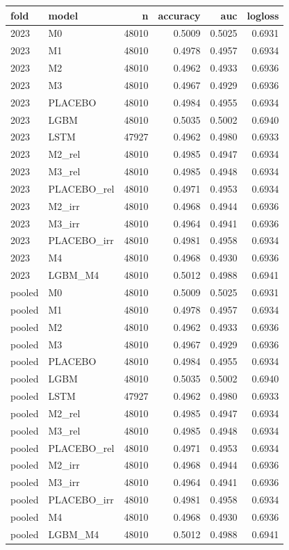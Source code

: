 \begin{tabular}{llrrrr}
\toprule
fold & model & n & accuracy & auc & logloss \\
\midrule
2023 & M0 & 48010 & 0.5009 & 0.5025 & 0.6931 \\
2023 & M1 & 48010 & 0.4978 & 0.4957 & 0.6934 \\
2023 & M2 & 48010 & 0.4962 & 0.4933 & 0.6936 \\
2023 & M3 & 48010 & 0.4967 & 0.4929 & 0.6936 \\
2023 & PLACEBO & 48010 & 0.4984 & 0.4955 & 0.6934 \\
2023 & LGBM & 48010 & 0.5035 & 0.5002 & 0.6940 \\
2023 & LSTM & 47927 & 0.4962 & 0.4980 & 0.6933 \\
2023 & M2\_rel & 48010 & 0.4985 & 0.4947 & 0.6934 \\
2023 & M3\_rel & 48010 & 0.4985 & 0.4948 & 0.6934 \\
2023 & PLACEBO\_rel & 48010 & 0.4971 & 0.4953 & 0.6934 \\
2023 & M2\_irr & 48010 & 0.4968 & 0.4944 & 0.6936 \\
2023 & M3\_irr & 48010 & 0.4964 & 0.4941 & 0.6936 \\
2023 & PLACEBO\_irr & 48010 & 0.4981 & 0.4958 & 0.6934 \\
2023 & M4 & 48010 & 0.4968 & 0.4930 & 0.6936 \\
2023 & LGBM\_M4 & 48010 & 0.5012 & 0.4988 & 0.6941 \\
pooled & M0 & 48010 & 0.5009 & 0.5025 & 0.6931 \\
pooled & M1 & 48010 & 0.4978 & 0.4957 & 0.6934 \\
pooled & M2 & 48010 & 0.4962 & 0.4933 & 0.6936 \\
pooled & M3 & 48010 & 0.4967 & 0.4929 & 0.6936 \\
pooled & PLACEBO & 48010 & 0.4984 & 0.4955 & 0.6934 \\
pooled & LGBM & 48010 & 0.5035 & 0.5002 & 0.6940 \\
pooled & LSTM & 47927 & 0.4962 & 0.4980 & 0.6933 \\
pooled & M2\_rel & 48010 & 0.4985 & 0.4947 & 0.6934 \\
pooled & M3\_rel & 48010 & 0.4985 & 0.4948 & 0.6934 \\
pooled & PLACEBO\_rel & 48010 & 0.4971 & 0.4953 & 0.6934 \\
pooled & M2\_irr & 48010 & 0.4968 & 0.4944 & 0.6936 \\
pooled & M3\_irr & 48010 & 0.4964 & 0.4941 & 0.6936 \\
pooled & PLACEBO\_irr & 48010 & 0.4981 & 0.4958 & 0.6934 \\
pooled & M4 & 48010 & 0.4968 & 0.4930 & 0.6936 \\
pooled & LGBM\_M4 & 48010 & 0.5012 & 0.4988 & 0.6941 \\
\bottomrule
\end{tabular}
